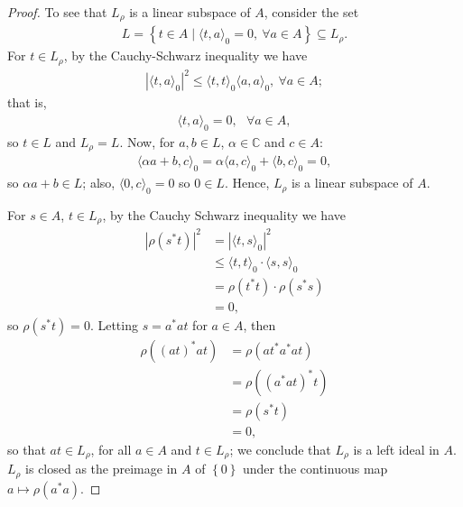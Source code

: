 \documentclass[11pt,a4paper]{report}
\theoremstyle{plain}
\theoremstyle{definition}
\newcommand{\1}{\mathbbm{1}}
\begin{document}
\begin{proof}
	To see that $L_\rho$ is a linear subspace of $A$, consider the set
	\begin{align*}
		L= \left\{t \in A  \mid \langle t,a \rangle _0 = 0,
				~\forall a \in A \right\} \subseteq L_\rho.
	\end{align*}
	For $t \in L_\rho$, by the Cauchy-Schwarz inequality we have 
	\begin{align*} 
		|\langle t,a \rangle_0|^2 \leq \langle t,t \rangle_0 \langle a,a\rangle_0,
				~ \forall a \in A;
	\end{align*}
	that is,
	\begin{align*}
		\langle t,a \rangle _0 = 0, ~~~ \forall a \in A,
	\end{align*}
	so $t\in L$ and $L_\rho =L$.
	Now, for $a,b \in L$, $\alpha \in \mathbb{C}$ and $c \in A$:
	\begin{align*}
		\langle \alpha a + b, c \rangle _0 = \alpha \langle a,c \rangle _0 + 
						\langle b,c\rangle _0 = 0,
	\end{align*}
	so $\alpha a +b \in L$; also, $\langle 0,c\rangle _0 = 0$ so $0 \in L$. 
	Hence, $L_\rho  $ is a linear subspace of $A$.
	
	For $s \in A$, $t\in L_\rho$, by the Cauchy Schwarz inequality we have 
	\begin{align*}
		|\rho (s^\ast t) |^2 	
		&= 		|\langle t,s\rangle_0 |^2 												\\
		&\leq 	\langle t,t\rangle_0 \cdot \langle s,s\rangle_0  						\\
		&= 		\rho (t^\ast t) \cdot \rho (s^\ast s)									\\
		&=		0,
	\end{align*}
	so $\rho (s^\ast t) = 0$. Letting $s = a^\ast a t$ for $a \in A$, then
	\begin{align*}
		\rho ((at)^\ast at) 
		&= 		\rho (at^\ast a^\ast at) 												\\
		&= 		\rho ((a^\ast at)^\ast t) 												\\
		&= 		\rho (s^\ast t) 														\\
		&=		0,
	\end{align*}
	so that $at \in L_\rho$, for all $a \in A$ and $t \in L_\rho$; we conclude that 
	$L_\rho$ is a left ideal in $A$. $L_\rho$ is closed as the preimage in $A$ of 
	$\left\{0\right\}$ under the continuous map $a \mapsto \rho (a^\ast a)$. 


\end{proof}
\end{document}
